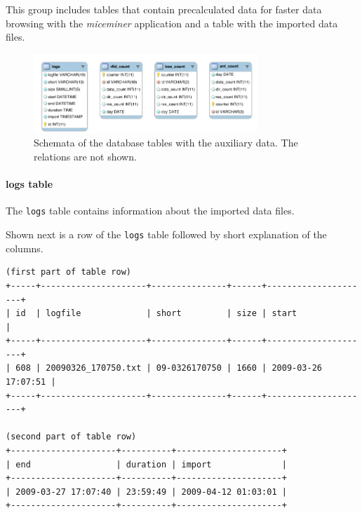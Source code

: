 This group includes tables that contain precalculated data for faster data browsing with the \textit{miceminer} application and a table with the imported data files. 

\begin{figure}[htpb]
\begin{center}
  \includegraphics[width=0.75\textwidth]{assets/pdf/auxiliary_tables_schema.pdf}
  \caption[Schema of database tables with system member data]{Schemata of the database tables with the auxiliary data. The relations are not shown.}
  \label{fig:auxiliary_tables}
\end{center}
\end{figure}

\paragraph{logs table}
\label{para:logs_table} 

The \lstinline|logs| table contains information about the imported data files.

Shown next is a row of the \lstinline|logs| table followed by short explanation of the columns.

\codescript
\begin{lstlisting}[frame=none]
(first part of table row)
+-----+---------------------+---------------+------+---------------------+
| id  | logfile             | short         | size | start               |
+-----+---------------------+---------------+------+---------------------+
| 608 | 20090326_170750.txt | 09-0326170750 | 1660 | 2009-03-26 17:07:51 |
+-----+---------------------+---------------+------+---------------------+

(second part of table row)
+---------------------+----------+---------------------+
| end                 | duration | import              |
+---------------------+----------+---------------------+
| 2009-03-27 17:07:40 | 23:59:49 | 2009-04-12 01:03:01 | 
+---------------------+----------+---------------------+

\end{lstlisting}

